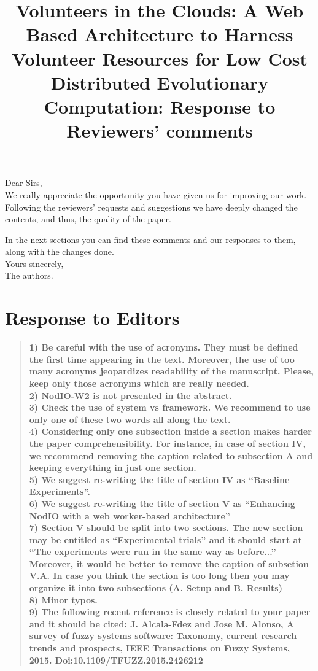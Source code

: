 \documentclass[preprint]{elsarticle}
\begin{document}

\title{Volunteers in the Clouds: A Web Based Architecture to Harness Volunteer Resources 
for Low Cost Distributed Evolutionary Computation: Response to Reviewers' comments}

\noindent
Dear Sirs,\\

We really appreciate the opportunity you have given us for improving
our work. Following the reviewers' requests and suggestions we have
deeply changed the contents, and thus, the quality of the paper. 

In the next sections you can find these comments and our responses
to them, along with the changes done.\\ 

\noindent
Yours sincerely,\\
The authors.


\section{Response to Editors}


\begin{quote}
\textbf{1) Be careful with the use of acronyms. They must be defined the first time appearing in the text. Moreover, the use of too many acronyms jeopardizes readability of the manuscript. Please, keep only those acronyms which are really needed.\\
2) NodIO-W2 is not presented in the abstract.\\
3) Check the use of system vs framework.
We recommend to use only one of these two words all along the text.\\
4) Considering only one subsection inside a section makes harder the paper comprehensibility.
For instance, in case of section IV, we recommend removing the caption related to subsection A and keeping everything in just one section.\\
5) We suggest re-writing the title of section IV as ``Baseline Experiments''.\\
6) We suggest re-writing the title of section V as ``Enhancing NodIO with a web worker-based architecture''\\
7) Section V should be split into two sections.
The new section may be entitled as ``Experimental trials'' and it should start at ``The experiments were run in the same way as before...''
Moreover, it would be better to remove the caption of subsetion V.A.
In case you think the section is too long then you may organize it into two subsections (A. Setup and B. Results)\\
8) Minor typos.\\
9) The following recent reference is closely related to your paper and it should be cited:
J. Alcala-Fdez and Jose M. Alonso, A survey of fuzzy systems software: Taxonomy, current research trends and prospects, IEEE Transactions on Fuzzy Systems, 2015. Doi:10.1109/TFUZZ.2015.2426212}
\end{quote}
\end{document}
